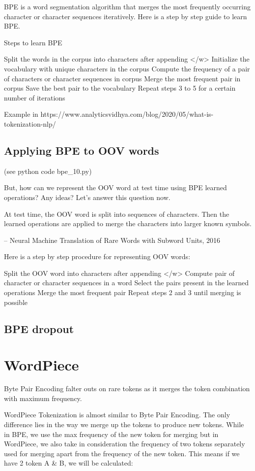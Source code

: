 BPE is a word segmentation algorithm that merges the most frequently occurring character or character sequences iteratively. Here is a step by step guide to learn BPE.

Steps to learn BPE

    Split the words in the corpus into characters after appending </w>
    Initialize the vocabulary with unique characters in the corpus
    Compute the frequency of a pair of characters or character sequences in corpus
    Merge the most frequent pair in corpus
    Save the best pair to the vocabulary
    Repeat steps 3 to 5 for a certain number of iterations

Example in https://www.analyticsvidhya.com/blog/2020/05/what-is-tokenization-nlp/

\subsection{Applying BPE to OOV words}

(see python code bpe\_10.py)

But, how can we represent the OOV word at test time using BPE learned operations? Any ideas? Let’s answer this question now.

    At test time, the OOV word is split into sequences of characters. Then the learned operations are applied to merge the characters into larger known symbols.

    – Neural Machine Translation of Rare Words with Subword Units, 2016

Here is a step by step procedure for representing OOV words:

    Split the OOV word into characters after appending </w>
    Compute pair of character or character sequences in a word
    Select the pairs present in the learned operations
    Merge the most frequent pair
    Repeat steps 2 and 3 until merging is possible

\subsection{BPE dropout}

\section{WordPiece}

Byte Pair Encoding falter outs on rare tokens as it merges the token combination with maximum frequency.

WordPiece Tokenization is almost similar to Byte Pair Encoding. The only difference lies in the way we merge up the tokens to produce new tokens. While in BPE, we use the max frequency of the new token for merging but in WordPiece, we also take in consideration the frequency of two tokens separately used for merging apart from the frequency of the new token. This means if we have 2 token A \& B, we will be calculated:

